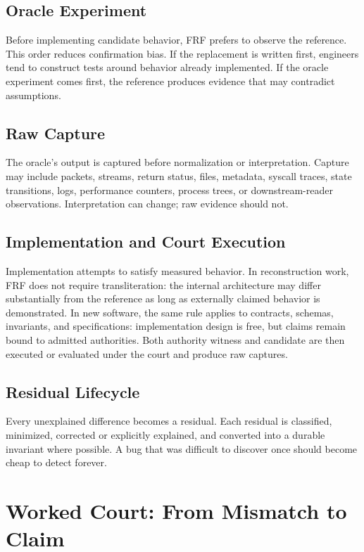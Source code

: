 \documentclass[11pt,a4paper]{article}
\newcommand{\frf}{\textsc{FRF}}
\begin{document}
\subsection{Oracle Experiment}
Before implementing candidate behavior, \frf{} prefers to observe the reference. This order reduces confirmation bias. If the replacement is written first, engineers tend to construct tests around behavior already implemented. If the oracle experiment comes first, the reference produces evidence that may contradict assumptions.

\subsection{Raw Capture}
The oracle's output is captured before normalization or interpretation. Capture may include packets, streams, return status, files, metadata, syscall traces, state transitions, logs, performance counters, process trees, or downstream-reader observations. Interpretation can change; raw evidence should not.

\subsection{Implementation and Court Execution}
Implementation attempts to satisfy measured behavior. In reconstruction work, \frf{} does not require transliteration: the internal architecture may differ substantially from the reference as long as externally claimed behavior is demonstrated. In new software, the same rule applies to contracts, schemas, invariants, and specifications: implementation design is free, but claims remain bound to admitted authorities. Both authority witness and candidate are then executed or evaluated under the court and produce raw captures.

\subsection{Residual Lifecycle}
Every unexplained difference becomes a residual. Each residual is classified, minimized, corrected or explicitly explained, and converted into a durable invariant where possible. A bug that was difficult to discover once should become cheap to detect forever.

\section{Worked Court: From Mismatch to Claim}
\label{sec:worked-court}
\end{document}
